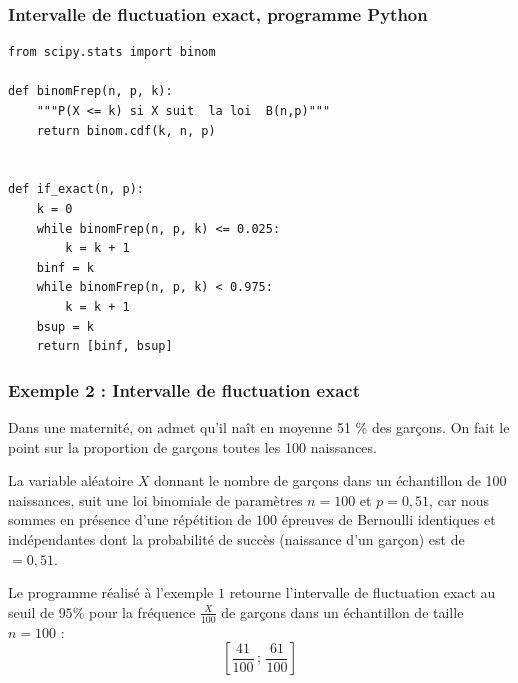 \documentclass[xcolor=svgnames,t,final]{beamer}
\newcommand{\Interff}[2]{\left[#1\, ;\, #2\right]}
\newcommand{\dispcasiotikz}{\begin{tikzpicture}[scale=0.2]
\fill (0,0) -- (1,0) -- (1,1) -- cycle;
\end{tikzpicture}} %
\begin{document}


\begin{frame}[fragile]
\frametitle{Intervalle de fluctuation exact, programme Python}


\begin{lstlisting}
from scipy.stats import binom

def binomFrep(n, p, k):
    """P(X <= k) si X suit  la loi  B(n,p)"""
    return binom.cdf(k, n, p)


def if_exact(n, p):
    k = 0
    while binomFrep(n, p, k) <= 0.025:
        k = k + 1
    binf = k
    while binomFrep(n, p, k) < 0.975:
        k = k + 1
    bsup = k
    return [binf, bsup]
\end{lstlisting}


\end{frame}


\begin{frame}
\label{exemple2}

\frametitle{Exemple 2 : Intervalle de fluctuation  exact}

Dans une maternité, on admet qu'il na\^it en moyenne 51 \% des garçons. On fait le point sur la proportion de garçons toutes les 100 naissances.

La  variable aléatoire $X$ donnant le nombre de garçons dans un échantillon de 100 naissances, suit une loi binomiale de paramètres $n=100$ et $p=0,51$, car nous sommes en présence d'une répétition de $100$ épreuves de Bernoulli identiques et indépendantes dont la probabilité de succès (naissance d'un garçon) est de $=0,51$.

Le programme réalisé à l'exemple $1$ retourne l'intervalle de fluctuation exact au seuil de $95 \%$ pour la fréquence $\frac{X}{100}$ de garçons  dans un échantillon de taille $n  = 100$ :
\begin{equation*}
\Interff{\frac{41}{100}}{\frac{61}{100}}
\end{equation*}


\end{frame}
\end{document}
